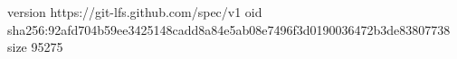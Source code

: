 version https://git-lfs.github.com/spec/v1
oid sha256:92afd704b59ee3425148cadd8a84e5ab08e7496f3d0190036472b3de83807738
size 95275
